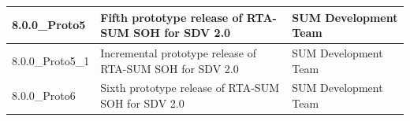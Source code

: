 \begin{longtable}{|l|l|l|}
\begin{minipage}{0.15\linewidth}\raggedright\vspace{.75ex}8.0.0\_Proto5\vspace{.75ex}\end{minipage} & \begin{minipage}{0.36\linewidth}\raggedright\vspace{.75ex}Fifth prototype release of RTA-SUM SOH for SDV 2.0\vspace{.75ex}\end{minipage} & \begin{minipage}{0.40\linewidth}\raggedright\vspace{.75ex}SUM Development Team\vspace{.75ex}\end{minipage}\\\hline
\begin{minipage}{0.15\linewidth}\raggedright\vspace{.75ex}8.0.0\_Proto5\_1\vspace{.75ex}\end{minipage} & \begin{minipage}{0.36\linewidth}\raggedright\vspace{.75ex}Incremental prototype release of RTA-SUM SOH for SDV 2.0\vspace{.75ex}\end{minipage} & \begin{minipage}{0.40\linewidth}\raggedright\vspace{.75ex}SUM Development Team\vspace{.75ex}\end{minipage}\\\hline
\begin{minipage}{0.15\linewidth}\raggedright\vspace{.75ex}8.0.0\_Proto6\vspace{.75ex}\end{minipage} & \begin{minipage}{0.36\linewidth}\raggedright\vspace{.75ex}Sixth prototype release of RTA-SUM SOH for SDV 2.0\vspace{.75ex}\end{minipage} & \begin{minipage}{0.40\linewidth}\raggedright\vspace{.75ex}SUM Development Team\vspace{.75ex}\end{minipage}\\\hline

\end{longtable}

